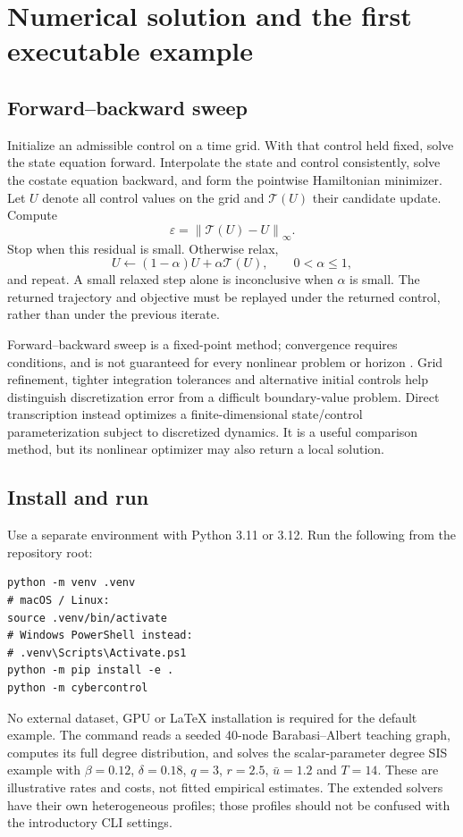 \documentclass[11pt,a4paper]{article}
\newcommand{\norm}[1]{\left\lVert#1\right\rVert}
\theoremstyle{definition}
\theoremstyle{remark}
\begin{document}
\section{Numerical solution and the first executable example}
\subsection{Forward--backward sweep}
Initialize an admissible control on a time grid. With that control held fixed, solve the state equation forward. Interpolate the state and control consistently, solve the costate equation backward, and form the pointwise Hamiltonian minimizer. Let $U$ denote all control values on the grid and $\mathcal T(U)$ their candidate update. Compute
\begin{equation}
\varepsilon=\norm{\mathcal T(U)-U}_\infty.
\end{equation}
Stop when this residual is small. Otherwise relax,
\begin{equation}
U\leftarrow(1-\alpha)U+\alpha\mathcal T(U),\qquad0<\alpha\le1,
\end{equation}
and repeat. A small relaxed step alone is inconclusive when $\alpha$ is small. The returned trajectory and objective must be replayed under the returned control, rather than under the previous iterate.

Forward--backward sweep is a fixed-point method; convergence requires conditions, and is not guaranteed for every nonlinear problem or horizon \cite{mcasey}. Grid refinement, tighter integration tolerances and alternative initial controls help distinguish discretization error from a difficult boundary-value problem. Direct transcription instead optimizes a finite-dimensional state/control parameterization subject to discretized dynamics. It is a useful comparison method, but its nonlinear optimizer may also return a local solution.

\subsection{Install and run}
Use a separate environment with Python 3.11 or 3.12. Run the following from the repository root:
\begin{lstlisting}[language={}]
python -m venv .venv
# macOS / Linux:
source .venv/bin/activate
# Windows PowerShell instead:
# .venv\Scripts\Activate.ps1
python -m pip install -e .
python -m cybercontrol
\end{lstlisting}
No external dataset, GPU or LaTeX installation is required for the default example. The command reads a seeded 40-node Barabasi--Albert teaching graph, computes its full degree distribution, and solves the scalar-parameter degree SIS example with $\beta=0.12$, $\delta=0.18$, $q=3$, $r=2.5$, $\bar u=1.2$ and $T=14$. These are illustrative rates and costs, not fitted empirical estimates. The extended solvers have their own heterogeneous profiles; those profiles should not be confused with the introductory CLI settings.
\end{document}
